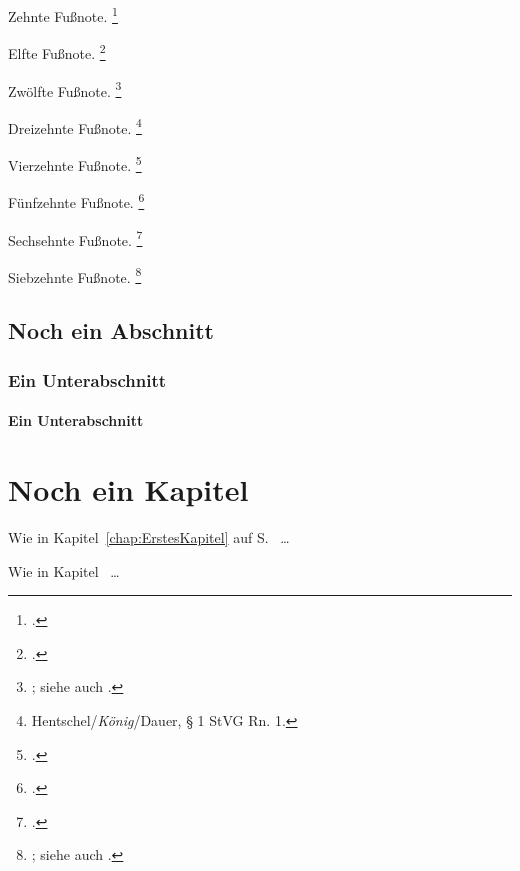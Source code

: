 \documentclass{hausarbeit-jura}
\begin{document}
Zehnte Fußnote. \footcite[Matusche-Beckmann][§~5 Rn.~14]{hdbversr}

Elfte Fußnote. \footcite[(Matusche-Beckmann)§~5 Rn.~14 (falsch zitiert)]{hdbversr}

Zwölfte Fußnote. \footnote{\cite[(Bearbeiter)§~433 Rn.~23]{staudinger}; siehe auch \cite[(Bearbeiter)§~123 Rn.~12]{muekobgb}.}

Dreizehnte Fußnote. \footnote{Hentschel/\emph{König}/Dauer, § 1 StVG Rn. 1.}

Vierzehnte Fußnote. \footcite[Rn. 3]{viiizr255.17}

Fünfzehnte Fußnote. \footcite[Rn. 15]{1str346.18}

Sechsehnte Fußnote. \footcite[3535]{1str346.18.2}

Siebzehnte Fußnote. \footnote{\cite[56]{laack:infra}; siehe auch \cite[401]{beckemper:unvernunft}.}

\section{Noch ein Abschnitt}
\blindtext

\subsection{Ein Unterabschnitt}
\blindtext

\subsubsection{Ein Unterabschnitt}
\blindtext

\blindtext

\blindtext

\blindtext

\blindtext

\blindtext

\blindtext

\chapter{Noch ein Kapitel}
Wie in Kapitel~\ref{chap:ErstesKapitel} auf S.~\pageref{chap:ErstesKapitel} \ldots

Wie in Kapitel~ \ldots

\newpage
\sloppy
{} %
\printbibliography[nottype=jurisdiction]
\end{document}
